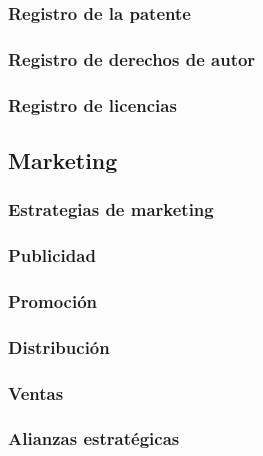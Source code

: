 \subsubsection{Registro de la patente}
\subsubsection{Registro de derechos de autor}
\subsubsection{Registro de licencias}

\subsection{Marketing}
\subsubsection{Estrategias de marketing}
\subsubsection{Publicidad}
\subsubsection{Promoción}
\subsubsection{Distribución}
\subsubsection{Ventas}
\subsubsection{Alianzas estratégicas}
